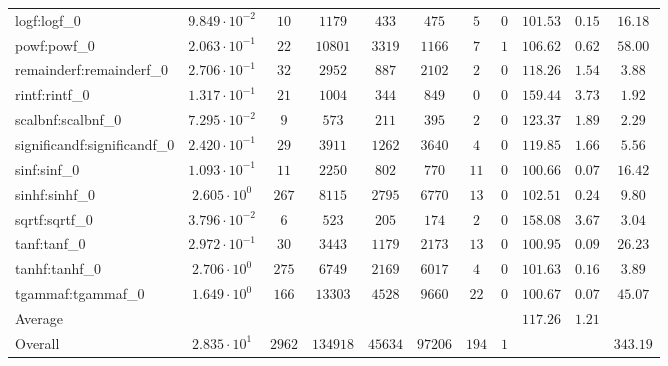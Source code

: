 \begin{tabular}{|l|c|c|c|c|c|c|c|c|c|c|}
logf:logf\_0                 & $ 9.849 \cdot 10^{-2} $ & $ 10     $ & $ 1179   $ & $ 433   $ & $ 475   $ & $ 5   $ & $ 0 $ & $ 101.53      $ & $ 0.15    $ & $ 16.18   $ \\
powf:powf\_0                 & $ 2.063 \cdot 10^{-1} $ & $ 22     $ & $ 10801  $ & $ 3319  $ & $ 1166  $ & $ 7   $ & $ 1 $ & $ 106.62      $ & $ 0.62    $ & $ 58.00   $ \\
remainderf:remainderf\_0     & $ 2.706 \cdot 10^{-1} $ & $ 32     $ & $ 2952   $ & $ 887   $ & $ 2102  $ & $ 2   $ & $ 0 $ & $ 118.26      $ & $ 1.54    $ & $ 3.88    $ \\
rintf:rintf\_0               & $ 1.317 \cdot 10^{-1} $ & $ 21     $ & $ 1004   $ & $ 344   $ & $ 849   $ & $ 0   $ & $ 0 $ & $ 159.44      $ & $ 3.73    $ & $ 1.92    $ \\
scalbnf:scalbnf\_0           & $ 7.295 \cdot 10^{-2} $ & $ 9      $ & $ 573    $ & $ 211   $ & $ 395   $ & $ 2   $ & $ 0 $ & $ 123.37      $ & $ 1.89    $ & $ 2.29    $ \\
significandf:significandf\_0 & $ 2.420 \cdot 10^{-1} $ & $ 29     $ & $ 3911   $ & $ 1262  $ & $ 3640  $ & $ 4   $ & $ 0 $ & $ 119.85      $ & $ 1.66    $ & $ 5.56    $ \\
sinf:sinf\_0                 & $ 1.093 \cdot 10^{-1} $ & $ 11     $ & $ 2250   $ & $ 802   $ & $ 770   $ & $ 11  $ & $ 0 $ & $ 100.66      $ & $ 0.07    $ & $ 16.42   $ \\
sinhf:sinhf\_0               & $ 2.605 \cdot 10^{0}  $ & $ 267    $ & $ 8115   $ & $ 2795  $ & $ 6770  $ & $ 13  $ & $ 0 $ & $ 102.51      $ & $ 0.24    $ & $ 9.80    $ \\
sqrtf:sqrtf\_0               & $ 3.796 \cdot 10^{-2} $ & $ 6      $ & $ 523    $ & $ 205   $ & $ 174   $ & $ 2   $ & $ 0 $ & $ 158.08      $ & $ 3.67    $ & $ 3.04    $ \\
tanf:tanf\_0                 & $ 2.972 \cdot 10^{-1} $ & $ 30     $ & $ 3443   $ & $ 1179  $ & $ 2173  $ & $ 13  $ & $ 0 $ & $ 100.95      $ & $ 0.09    $ & $ 26.23   $ \\
tanhf:tanhf\_0               & $ 2.706 \cdot 10^{0}  $ & $ 275    $ & $ 6749   $ & $ 2169  $ & $ 6017  $ & $ 4   $ & $ 0 $ & $ 101.63      $ & $ 0.16    $ & $ 3.89    $ \\
tgammaf:tgammaf\_0           & $ 1.649 \cdot 10^{0}  $ & $ 166    $ & $ 13303  $ & $ 4528  $ & $ 9660  $ & $ 22  $ & $ 0 $ & $ 100.67      $ & $ 0.07    $ & $ 45.07   $ \\
\hline
Average                      & $                     $ & $        $ & $        $ & $       $ & $       $ & $     $ & $   $ & $ 117.26      $ & $ 1.21    $ & $         $ \\
\hline
Overall                      & $ 2.835 \cdot 10^{1}  $ & $ 2962   $ & $ 134918 $ & $ 45634 $ & $ 97206 $ & $ 194 $ & $ 1 $ & $             $ & $         $ & $ 343.19  $ \\
\hline
\end{tabular}
